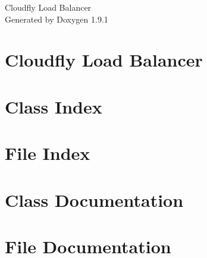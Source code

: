 \let\mypdfximage\pdfximage\def\pdfximage{\immediate\mypdfximage}\documentclass[twoside]{book}
\newcommand{\+}{\discretionary{\mbox{\scriptsize$\hookleftarrow$}}{}{}}
\newcommand{\clearemptydoublepage}{%
  \newpage{\pagestyle{empty}\cleardoublepage}%
}
\begin{document}
\raggedbottom

\hypersetup{pageanchor=false,
             bookmarksnumbered=true,
             pdfencoding=unicode
            }
\begin{titlepage}
\vspace*{7cm}
\begin{center}%
{\Large Cloudfly Load Balancer }\\
\vspace*{1cm}
{\large Generated by Doxygen 1.9.1}\\
\end{center}
\end{titlepage}
\clearemptydoublepage
{}
\tableofcontents
\clearemptydoublepage
{}
\hypersetup{pageanchor=true}

\chapter{Cloudfly Load Balancer}
\label{index}\hypertarget{index}{}
\chapter{Class Index}

\chapter{File Index}

\chapter{Class Documentation}







\chapter{File Documentation}








\backmatter
\newpage
{}
\clearemptydoublepage
{}
\printindex
\end{document}
